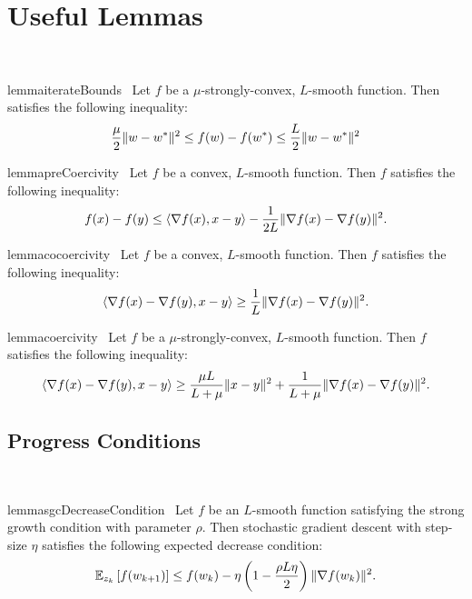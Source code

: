 
\section{Useful Lemmas}~\label{app:useful-lemmas}

\begin{restatable}{lemma}{iterateBounds}~\label{lemma:iterate-bounds}
    Let \( f \) be a \( \mu \)-strongly-convex, \( L \)-smooth function. Then satisfies the following inequality:
    \[ \frac{\mu}{2} \|w - w^*\|^2 \leq f(w) - f(w^*) \leq \frac{L}{2} \|w - w^*\|^2 \]
\end{restatable}


\begin{restatable}{lemma}{preCoercivity}~\label{lemma:pre-coercivity}
    Let \( f  \) be a convex, \( L  \)-smooth function. 
    Then \( f  \) satisfies the following inequality:
    \[ f(x) - f(y)  \leq  \left\langle\nabla f(x), x - y\right\rangle- \frac{1}{2L} \|\nabla f(x) - \nabla f(y)\|^2. \] 
\end{restatable}


\begin{restatable}{lemma}{cocoercivity}~\label{lemma:co-coercivity}
    Let \( f  \) be a convex, \( L  \)-smooth function. 
    Then \( f  \) satisfies the following inequality:
    \[ \left\langle\nabla f(x) - \nabla f(y), x - y\right\rangle \geq \frac{1}{L} \|\nabla f(x) - \nabla f(y)\|^2. \] 
\end{restatable}


\begin{restatable}{lemma}{coercivity}~\label{lemma:coercivity}
    Let \( f  \) be a \( \mu  \)-strongly-convex, \( L  \)-smooth function. 
    Then \( f  \) satisfies the following inequality:
    \[ \left\langle\nabla f(x) - \nabla f(y), x - y\right\rangle \geq \frac{\mu L}{L + \mu}\|x - y\|^2 + \frac{1}{L + \mu} \|\nabla f(x) - \nabla f(y)\|^2.  \] 
\end{restatable}

\subsection{Progress Conditions}~\label{app:progress-conditions}

\begin{restatable}{lemma}{sgcDecreaseCondition}~\label{lemma:sgc-decrease-condition}
    Let \( f \) be an \( L \)-smooth function satisfying the strong growth condition with parameter \( \rho \).
    Then stochastic gradient descent with step-size \( \eta \) satisfies the following expected decrease condition:
    \[ \mathbb{E}_{z_{k}} \left[f(w_{k+1})\right] \leq f(w_k) - \eta \left(1 - \frac{\rho L \eta}{2}\right)\|\nabla f(w_k)\|^2. \]
\end{restatable}

